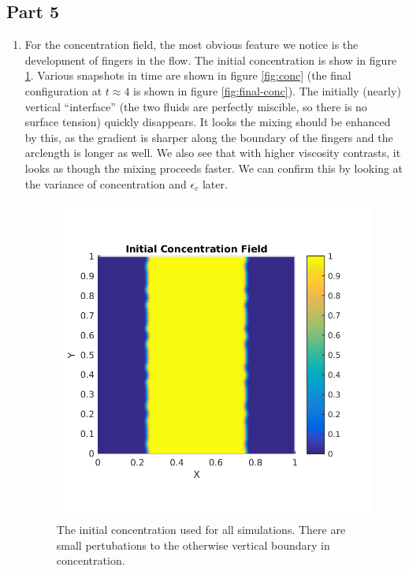 \documentclass{article}
\begin{document}
\subsection{Part 5}
\begin{enumerate}
\item For the concentration field, the most obvious feature we notice is the development of fingers in the flow.
The initial concentration is show in figure \ref{fig:initial-conc}.
Various snapshots in time are shown in figure \ref{fig:conc} (the final configuration at $t \approx 4$ is shown in figure \ref{fig:final-conc}).
The initially (nearly) vertical ``interface'' (the two fluids are perfectly miscible, so there is no surface tension) quickly disappears.
It looks the mixing should be enhanced by this, as the gradient is sharper along the boundary of the fingers and the arclength is longer as well.
We also see that with higher viscosity contrasts, it looks as though the mixing proceeds faster.
We can confirm this by looking at the variance of concentration and $\epsilon_c$ later.

\begin{figure}[!ht]
\centering
\includegraphics[scale=1.0]{initial_conc.png}
\caption{The initial concentration used for all simulations. There are small pertubations to the otherwise vertical boundary in concentration.}
\label{fig:initial-conc}
\end{figure}


\end{enumerate}
\end{document}
